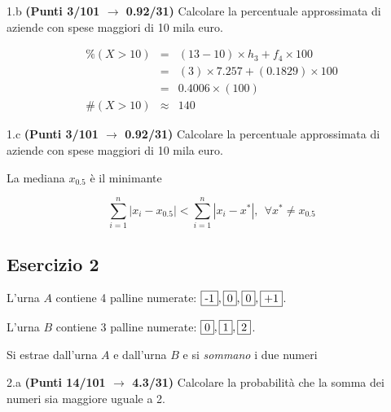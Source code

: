 \documentclass[
  11pt,
]{book}
\theoremstyle{mytheoremstyle}
\theoremstyle{mydefstyle}
\newenvironment{sol}
  {
  \begin{tcolorbox}[enhanced,breakable,arc=0.1mm,boxrule=1pt,colback=white,colframe=iblue,
  title=\bf \fontfamily{lmss}\selectfont \hspace{.5 cm} Soluzione,drop fuzzy shadow]

}{
\end{tcolorbox}
  }
\begin{document}
1.b \textbf{(Punti 3/101 \(\rightarrow\) 0.92/31)} Calcolare la percentuale approssimata di aziende
con spese maggiori di 10 mila euro.

\begin{sol}
\begin{eqnarray*}
     \%(X> 10 ) &=& ( 13 - 10 )\times h_{ 3 }+ f_{ 4 }\times 100 \\
              &=& ( 3 )\times 7.257 + ( 0.1829 )\times 100 \\
              &=&  0.4006 \times(100)\\
     \#(X> 10 ) &\approx& 140 
         \end{eqnarray*}

\end{sol}

1.c \textbf{(Punti 3/101 \(\rightarrow\) 0.92/31)} Calcolare la percentuale approssimata di aziende
con spese maggiori di 10 mila euro.

\begin{sol}
La mediana \(x_{0.5}\) è il minimante

\[
\sum_{i=1}^n|x_i-x_{0.5}|<\sum_{i=1}^n|x_i-x^*|, ~~\forall x^*\neq x_{0.5}
\]

\end{sol}

\subsection{Esercizio 2}\label{esercizio-2-6}

L'urna \(A\) contiene 4 palline numerate: \(\fbox{-1},\fbox{0},\fbox{0},\fbox{+1}\).

L'urna \(B\) contiene 3 palline numerate: \(\fbox{0},\fbox{1},\fbox{2}\).

Si estrae dall'urna \(A\) e dall'urna \(B\) e si \emph{sommano} i due numeri

2.a \textbf{(Punti 14/101 \(\rightarrow\) 4.3/31)} Calcolare la probabilità che la somma dei numeri sia maggiore uguale a 2.
\end{document}
